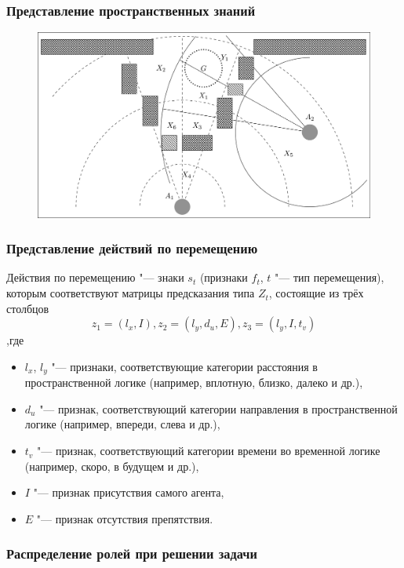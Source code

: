 \documentclass[default]{beamer}
\begin{document}
	\begin{frame}
		\frametitle{Представление пространственных знаний}
		
		\begin{figure}
			\includegraphics[width=\textwidth]{examples/rita_ex_proc.png}
		\end{figure}
	\end{frame}
	
	\begin{frame}
		\frametitle{Представление действий по перемещению}
		
		Действия по перемещению "--- знаки $s_t$ (признаки $f_t$, $t$ "--- тип перемещения), которым соответствуют матрицы предсказания типа $Z_t$, состоящие из трёх столбцов 
		\[
		z_1=(l_x, I), z_2=(l_y, d_u, E), z_3=(l_y, I, t_v)
		\]
		,где 
		\begin{itemize}
			\item $l_x$, $l_y$ "--- признаки, соответствующие категории расстояния в пространственной логике  (например, вплотную, близко, далеко и др.), 
			\item $d_u$ "--- признак, соответствующий категории направления в пространственной логике (например, впереди, слева и др.), 
			\item $t_v$ "--- признак, соответствующий категории времени во временной логике (например, скоро, в будущем и др.),
			\item $I$ "--- признак присутствия самого агента, 
			\item $E$ "--- признак отсутствия препятствия.
		\end{itemize}
	\end{frame}	
	
	\begin{frame}
		\frametitle{Распределение ролей при решении задачи}
		\begin{center}
		\end{center}
	\end{frame}
	
\end{document}
